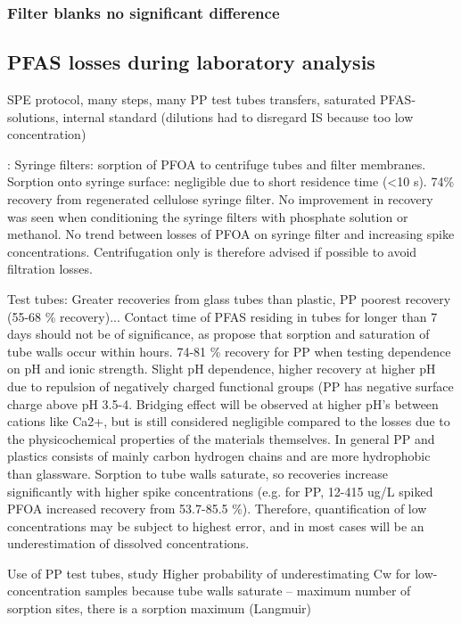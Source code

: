 \subsubsection{Filter blanks no significant difference}

\subsection{PFAS losses during laboratory analysis}
SPE protocol, many steps, many PP test tubes transfers, saturated PFAS-solutions, internal standard (dilutions had to disregard IS because too low concentration)

\citep{Lath2019labsorb}: 
Syringe filters: sorption of PFOA to centrifuge tubes and filter membranes. Sorption onto syringe surface: negligible due to short residence time (\textless 10 s). 74\% recovery from regenerated cellulose syringe filter. No improvement in recovery was seen when conditioning the syringe filters with phosphate solution or methanol. No trend between losses of PFOA on syringe filter and increasing spike concentrations. Centrifugation only is therefore advised if possible to avoid filtration losses. 

Test tubes: Greater recoveries from glass tubes than plastic, PP poorest recovery (55-68 \% recovery)... Contact time of PFAS residing in tubes for longer than 7 days should not be of significance, as \citep{Lath2019labsorb} propose that sorption and saturation of tube walls occur within hours. 74-81 \% recovery for PP when testing dependence on pH and ionic strength. Slight pH dependence, higher recovery at higher pH due to repulsion of negatively charged functional groups (PP has negative surface charge above pH 3.5-4. Bridging effect will be observed at higher pH's between cations like Ca2+, but is still considered negligible compared to the losses due to the physicochemical properties of the materials themselves. In general PP and plastics consists of mainly carbon hydrogen chains and are more hydrophobic than glassware. Sorption to tube walls saturate, so recoveries increase significantly with higher spike concentrations (e.g. for PP, 12-415 ug/L spiked PFOA increased recovery from 53.7-85.5 \%). Therefore, quantification of low concentrations may be subject to highest error, and in most cases will be an underestimation of dissolved concentrations. 

Use of PP test tubes, study
Higher probability of underestimating Cw for low-concentration samples because tube walls saturate – maximum number of sorption sites, there is a sorption maximum (Langmuir)

